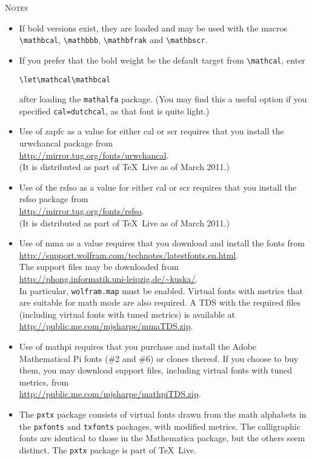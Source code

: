 \documentclass[11pt]{amsart}
\begin{document}
\textsc{Notes}
\begin{itemize}
\item If bold versions exist, they are loaded and may be used with the macros \verb|\mathbcal|, \verb|\mathbbb|, \verb|\mathbfrak| and \verb|\mathbscr|.
\item If you prefer that the bold weight be the default target from \verb|\mathcal|, enter
\begin{verbatim}
\let\mathcal\mathbcal
\end{verbatim}
after loading the {\tt mathalfa} package. (You may find this a useful option if you specified {\tt cal=dutchcal}, as that font is quite light.)
\item
Use of \textsf{zapfc} as a value for either \textsf{cal} or \textsf{scr} requires that you install the \textsf{urwchancal} package from\\
 \url{http://mirror.tug.org/fonts/urwchancal}.\\
  (It is distributed as part of \TeX\ Live as of March 2011.)
\item Use of the \textsf{rsfso} as a value for either \textsf{cal} or \textsf{scr} requires that you install the \textsf{rsfso} package from\\
 \url{http://mirror.tug.org/fonts/rsfso}.\\
  (It is distributed as part of \TeX\ Live as of March 2011.)
\item Use of \textsf{mma} as a value  requires that you download and install the fonts from\\
\url{http://support.wolfram.com/technotes/latestfonts.en.html}.\\ 
The support files may be downloaded from\\
\url{http://phong.informatik.uni-leipzig.de/~kuska/}.\\
In particular, {\tt wolfram.map} must be enabled. Virtual fonts with metrics that are suitable for math mode are also required. A TDS with the required files (including virtual fonts with tuned metrics) is available at\\ \url{http://public.me.com/mjsharpe/mmaTDS.zip}.
\item Use of \textsf{mathpi}  requires that you purchase and install the Adobe Mathematical Pi fonts (\#2 and \#6) or  clones thereof. If you choose to buy them, you may download support files, including virtual fonts with tuned metrics, from \\
\url{http://public.me.com/mjsharpe/mathpiTDS.zip}.
\item The {\tt pxtx} package consists of virtual fonts drawn from the math alphabets in the {\tt pxfonts} and {\tt txfonts} packages, with modified metrics. The calligraphic fonts are identical to those in the Mathematica package, but the others seem distinct. The {\tt pxtx} package is part of \TeX\ Live.

\end{itemize}
\end{document}
